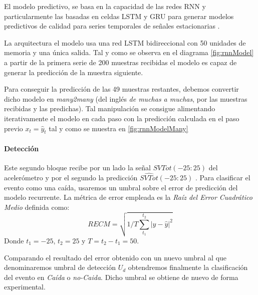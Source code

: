
El modelo predictivo, se basa en la capacidad de las redes RNN y particularmente las basadas en celdas LSTM y GRU para generar modelos predictivos de calidad para series temporales de señales estacionarias \cite{Qin2019}.

La arquitectura el modelo usa una red LSTM bidireccional con 50 unidades de memoria y una única salida. Tal y como se observa en el diagrama \ref{fig:rnnModel} a partir de la primera serie de 200 muestras recibidas el modelo es capaz de generar la predicción de la muestra siguiente.

Para conseguir la predicción de las 49 muestras restantes, debemos convertir dicho modelo en \textit{many2many} (del inglés \textit{de muchas a muchas}, por las muestras recibidas y las predichas). Tal manipulación se consigue alimentando iterativamente el modelo en cada paso con la predicción calculada en el paso previo $x_{t} = \hat{y}_t$ tal y como se muestra en \ref{fig:rnnModelMany}





\paragraph*{Detección}

Este segundo bloque recibe por un lado la señal $SVTot(-25:25)$ del acelerómetro y por el segundo la predicción $\hat{SVTot}(-25:25)$ . Para clasificar el evento como una caída, usaremos un umbral sobre el error de predicción del modelo recurrente. La métrica de error empleada es la \textit{Raíz del Error Cuadrático Medio} definida como: \[
RECM=\sqrt{1/T\sum_{t_1}^{t_2}|y-\hat{y}|^2 }
\]Donde $t_1 = -25$, $t_2 = 25$ y $T=t_2-t_1=50$.

Comparando el resultado del error obtenido con un nuevo umbral al que denominaremos umbral de detección $U_{d}$ obtendremos finalmente la clasificación del evento en \textit{Caída} o \textit{no-Caida}. Dicho umbral se obtiene de nuevo de forma experimental.

